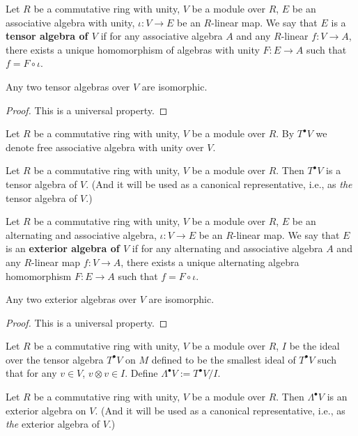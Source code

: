 \begin{definition}
  Let
    $R$ be a commutative ring with unity,
    $V$ be a module over $R$,
    $E$ be an associative algebra with unity,
    $\iota \colon V \to E$ be an $R$-linear map.
  We say that $E$ is a \textbf{tensor algebra of $V$} if for any associative
  algebra $A$ and any $R$-linear $f \colon V \to A$,
  there exists a unique homomorphism of algebras with unity
  $F \colon E \to A$ such that $f = F \circ \iota$.
\end{definition}
\begin{proposition}
  Any two tensor algebras over $V$ are isomorphic.
\end{proposition}
\begin{proof}
  This is a universal property.
\end{proof}
\begin{notation}
  Let
    $R$ be a commutative ring with unity,
    $V$ be a module over $R$.
  By $T^\bullet V$  we denote free associative algebra with unity over $V$.
\end{notation}
\begin{proposition}
  Let
    $R$ be a commutative ring with unity,
    $V$ be a module over $R$.
  Then $T^\bullet V$ is a tensor algebra of $V$.
  (And it will be used as a canonical representative, i.e., as
  \emph{the} tensor algebra of $V$.)
\end{proposition}
\begin{definition}
  Let
    $R$ be a commutative ring with unity,
    $V$ be a module over $R$,
    $E$ be an alternating and associative algebra,
    $\iota \colon V \to E$ be an $R$-linear map.
  We say that $E$ is an \textbf{exterior algebra of $V$} if for any alternating
  and associative algebra $A$ and any $R$-linear map $f \colon V \to A$,
  there exists a unique alternating algebra homomorphism
  $F \colon E \to A$ such that $f = F \circ \iota$.
\end{definition}
\begin{proposition}
  Any two exterior algebras over $V$ are isomorphic.
\end{proposition}
\begin{proof}
  This is a universal property.
\end{proof}
\begin{notation}
  Let
    $R$ be a commutative ring with unity,
    $V$ be a module over $R$,
    $I$ be the ideal over the tensor algebra $T^\bullet V$ on $M$ defined to be
    the smallest ideal of $T^\bullet V$ such that for any $v \in V$,
    $v \otimes v \in I$.
  Define $\Lambda^\bullet V := T^\bullet V / I$.
\end{notation}
\begin{proposition}
  Let
    $R$ be a commutative ring with unity,
    $V$ be a module over $R$.
  Then $\Lambda^\bullet V$ is an exterior algebra on $V$.
  (And it will be used as a canonical representative, i.e., as
  \emph{the} exterior algebra of $V$.)
\end{proposition}
